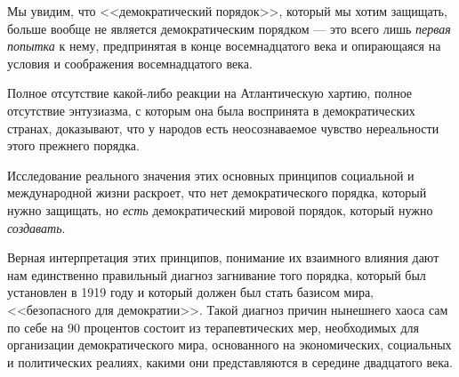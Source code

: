 Мы увидим, что <<демократический порядок>>, который мы хотим защищать, больше вообще не является демократическим порядком — это всего лишь \textit{первая попытка} к нему, предпринятая в конце восемнадцатого века и опирающаяся на условия и соображения восемнадцатого века.

Полное отсутствие какой-либо реакции на Атлантическую хартию, полное отсутствие энтузиазма, с которым она была воспринята в демократических странах, доказывают, что у народов есть неосознаваемое чувство нереальности этого прежнего порядка.

Исследование реального значения этих основных принципов социальной и международной жизни раскроет, что нет демократического порядка, который нужно защищать, но \textit{есть} демократический мировой порядок, который нужно \textit{создавать}.

Верная интерпретация этих принципов, понимание их взаимного влияния дают нам единственно правильный диагноз загнивание того порядка, который был установлен в 1919 году и который должен был стать базисом мира, <<безопасного для демократии>>. Такой диагноз причин нынешнего хаоса сам по себе на 90 процентов состоит из терапевтических мер, необходимых для организации демократического мира, основанного на экономических, социальных и политических реалиях, какими они представляются в середине двадцатого века.

